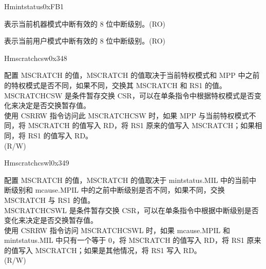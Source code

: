 \begin{register}{H}{mintstatus}{0xFB1}
\label{regdesc:MINTSTATUS}
%
%
%
\regnewline%
\begin{regdesc}\begin{reglist}
\label{fielddesc:MINTSTATUS_MIL}\item [MIL] 表示当前机器模式中断有效的 8 位中断级别。(RO)
\label{fielddesc:MINTSTATUS_UIL}\item [UIL] 表示当前用户模式中断有效的 8 位中断级别。(RO)
\end{reglist}\end{regdesc}
\end{register}


\begin{register}{H}{mscratchcsw}{0x348}\label{regdesc:MSCRATCHCSW_REG}
%
\regnewline%
\begin{regdesc}\begin{reglist}
\label{fielddesc:MSCRATCHCSW}\item [MSCRATCHCSW] 配置 MSCRATCH 的值，MSCRATCH 的值取决于当前特权模式和 MPP 中之前的特权模式是否不同，如果不同，交换其 MSCRATCH 和 RS1 的值。\\
MSCRATCHCSW 是条件暂存交换 CSR，可以在单条指令中根据特权模式是否变化来决定是否交换暂存值。\\
使用 CSRRW 指令访问此 MSCRATCHCSW 时，如果 MPP 与当前特权模式不同，将 MSCRATCH 的值写入 RD，将 RS1 原来的值写入 MSCRATCH；如果相同，将 RS1 的值写入 RD。\\
(R/W)
\end{reglist}\end{regdesc}
\end{register}

\begin{register}{H}{mscratchcswl}{0x349}\label{regdesc:MSCRATCHCSWL_REG}
%
\regnewline%
\begin{regdesc}\begin{reglist}
\label{fielddesc:MSCRATCHCSWL}\item [MSCRATCHCSWL] 配置 MSCRATCH 的值，MSCRATCH 的值取决于 mintstatus.MIL 中的当前中断级别和 mcause.MPIL 中的之前中断级别是否不同，如果不同，交换 MSCRATCH 与 RS1 的值。\\
MSCRATCHCSWL 是条件暂存交换 CSR，可以在单条指令中根据中断级别是否变化来决定是否交换暂存值。\\
使用 CSRRW 指令访问 MSCRATCHCSWL 时，如果 mcause.MPIL 和 mintstatus.MIL 中只有一个等于 0，将 MSCRATCH 的值写入 RD，将 RS1 原来的值写入 MSCRATCH；如果是其他情况，将 RS1 写入 RD。\\

(R/W)
\end{reglist}\end{regdesc}
\end{register}

